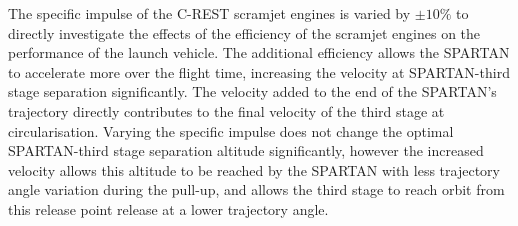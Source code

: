 The specific impulse of the C-REST scramjet engines is varied by $\pm10\%$ to directly investigate the effects of the efficiency of the scramjet engines on the performance of the launch vehicle. 
The additional efficiency allows the SPARTAN to accelerate more over the flight time, increasing the velocity at SPARTAN-third stage separation significantly. The velocity added to the end of the SPARTAN's trajectory directly contributes to the final velocity of the third stage at circularisation. Varying the specific impulse does not change the optimal SPARTAN-third stage separation altitude significantly, however the increased velocity allows this altitude to be reached by the SPARTAN with less trajectory angle variation during the pull-up, and allows the third stage to reach orbit from this release point release at a lower trajectory angle.

